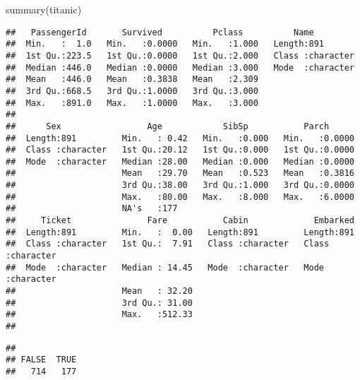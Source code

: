 \documentclass[
]{article}
\newenvironment{Shaded}{\begin{snugshade}}{\end{snugshade}}
\newcommand{\FunctionTok}[1]{\textcolor[rgb]{0.00,0.00,0.00}{#1}}
\newcommand{\NormalTok}[1]{#1}
\newcommand{\SpecialCharTok}[1]{\textcolor[rgb]{0.00,0.00,0.00}{#1}}
\begin{document}
\begin{Shaded}
\begin{Highlighting}[]
\FunctionTok{summary}\NormalTok{(titanic)}
\end{Highlighting}
\end{Shaded}

\begin{verbatim}
##   PassengerId       Survived          Pclass          Name          
##  Min.   :  1.0   Min.   :0.0000   Min.   :1.000   Length:891        
##  1st Qu.:223.5   1st Qu.:0.0000   1st Qu.:2.000   Class :character  
##  Median :446.0   Median :0.0000   Median :3.000   Mode  :character  
##  Mean   :446.0   Mean   :0.3838   Mean   :2.309                     
##  3rd Qu.:668.5   3rd Qu.:1.0000   3rd Qu.:3.000                     
##  Max.   :891.0   Max.   :1.0000   Max.   :3.000                     
##                                                                     
##      Sex                 Age            SibSp           Parch       
##  Length:891         Min.   : 0.42   Min.   :0.000   Min.   :0.0000  
##  Class :character   1st Qu.:20.12   1st Qu.:0.000   1st Qu.:0.0000  
##  Mode  :character   Median :28.00   Median :0.000   Median :0.0000  
##                     Mean   :29.70   Mean   :0.523   Mean   :0.3816  
##                     3rd Qu.:38.00   3rd Qu.:1.000   3rd Qu.:0.0000  
##                     Max.   :80.00   Max.   :8.000   Max.   :6.0000  
##                     NA's   :177                                     
##     Ticket               Fare           Cabin             Embarked        
##  Length:891         Min.   :  0.00   Length:891         Length:891        
##  Class :character   1st Qu.:  7.91   Class :character   Class :character  
##  Mode  :character   Median : 14.45   Mode  :character   Mode  :character  
##                     Mean   : 32.20                                        
##                     3rd Qu.: 31.00                                        
##                     Max.   :512.33                                        
## 
\end{verbatim}

\begin{Shaded}
\end{Shaded}

\begin{verbatim}
## 
## FALSE  TRUE 
##   714   177
\end{verbatim}
\end{document}

